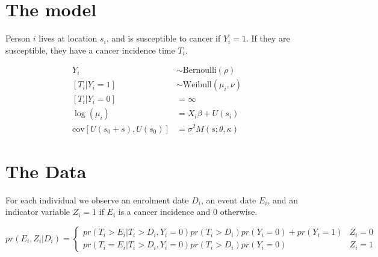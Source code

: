 \documentclass{article}
\begin{document}
\section{The model}
Person $i$ lives at location $s_i$, and is susceptible to cancer if $Y_i=1$.  If they are susceptible, they have a cancer incidence time $T_i$.

\begin{align*}
Y_i & \sim \text{Bernoulli}(\rho)\\
[T_i | Y_i = 1] &\sim \text{Weibull}(\mu_i, \nu)\\
[T_i | Y_i = 0] & = \infty \\
\log(\mu_i) &= X_i \beta + U(s_i)\\
\text{cov}[U(s_0 + s), U(s_0)] &= \sigma^2 M(s; \theta, \kappa) 
\end{align*}

\section{The Data}
For each individual we observe an enrolment date $D_i$, an event date $E_i$, and an indicator variable $Z_i = 1$ if $E_i$ is a cancer incidence and 0 otherwise.

\[
pr(E_i, Z_i | D_i) = 
\begin{cases}
pr(T_i > E_i | T_i > D_i, Y_i =0) pr(T_i > D_i) pr(Y_i = 0) + pr(Y_i =1) & Z_i = 0 \\
pr(T_i = E_i | T_i > D_i, Y_i =0) pr(T_i > D_i) pr(Y_i = 0) & Z_i = 1
\end{cases}
\]
\end{document}
